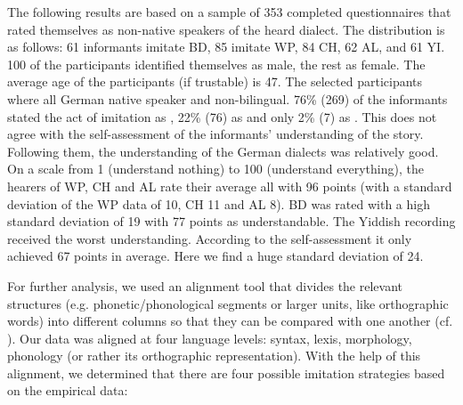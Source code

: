 \documentclass[output=paper]{LSP/langsci}
\begin{document}
The following results are based on a sample of 353 completed questionnaires that rated themselves as non-native speakers of the heard dialect. The distribution is as follows: 61 informants imitate BD, 85 imitate WP, 84 CH, 62 AL, and 61 YI. 100 of the participants identified themselves as male, the rest as female. The average age of the participants (if trustable) is 47. The selected participants where all German native speaker and non-bilingual. 76\% (269) of the informants stated the act of imitation as , 22\% (76) as  and only 2\% (7) as . This does not agree with the self-assessment of the informants' understanding of the story. Following them, the understanding of the German dialects was rela\-tively good. On a scale from 1 (understand nothing) to 100 (understand everything), the hearers of WP, CH and AL rate their average all with 96 points (with a standard deviation of the WP data of 10, CH 11 and AL 8). BD was rated with a high standard deviation of 19 with 77 points as understandable. The Yiddish recording received the worst understanding. According to the self-assessment it only achieved 67 points in average. Here we find a huge standard deviation of 24.

For further analysis, we used an alignment tool that divides the relevant structures (e.g. phonetic/phonological segments or larger units, like orthographic words) into different columns so that they can be compared with one another (cf. \cite{mayer_language_2012}). Our data was aligned at four language levels: syntax, lexis, morphology, phonology (or rather its orthographic representation). With the help of this alignment, we determined that there are four possible imitation strategies based on the empirical data:
 
\end{document}
